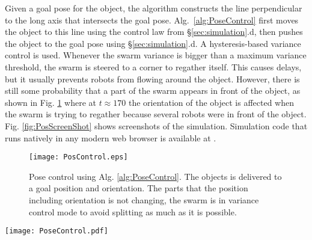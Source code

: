 Given a goal pose for the object, the algorithm constructs the line perpendicular to the long axis that intersects the goal pose. Alg.~\ref{alg:PoseControl} first moves the object to this line using the control law from \S\ref{sec:simulation}.d, then pushes the object to the goal pose using \S\ref{sec:simulation}.d.
A hysteresis-based variance control is used.  Whenever the swarm variance is bigger than a maximum variance threshold, the swarm is steered to  a corner to regather itself. 
This causes delays, but it usually prevents robots from flowing around the object. However, there is still some probability that a part of the swarm appears in front of the object, as shown in Fig. \ref{fig:PosControlFig} where at $t\approx170$ the orientation of the object is affected when the swarm is trying to regather because several robots were in front of the object. Fig. \ref{fig:PosScreenShot} shows screenshots of the simulation. Simulation code that runs natively in any modern web browser is available at \cite{Shahrokhi16pose}.

\begin{figure}
\begin{center}
	\texttt{[image: PosControl.eps]}
\end{center}
\vspace{-2em}
\caption{\label{fig:PosControlFig} 
Pose control using Alg. \ref{alg:PoseControl}.  The objects is delivered to a goal position and orientation. The parts that the position including orientation is not changing, the swarm is in variance control mode to avoid splitting as much as it is possible. 
}
\vspace{-1em}
\end{figure}


\begin{figure*}
\centering

\texttt{[image: PoseControl.pdf]}
\vspace{0em}
\caption{\label{fig:PosScreenShot}
Different stages for position control of a block while controlling its orientation. The first task (0--90 s) is to push the object COM to a line perpendicular to the goal. The second task (90--210 s) is to push the object along this perpendicular line while regulating the orientation.
}
\end{figure*}


